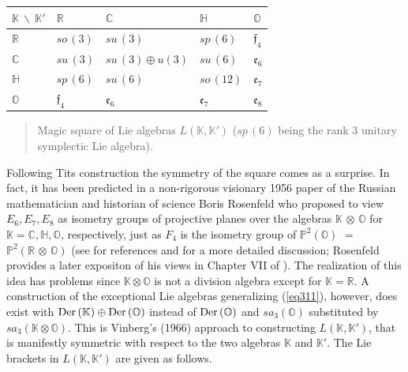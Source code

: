 \documentclass{article}
\begin{document}
\bigskip

\begin{tabular}{|C{1cm}|C{2cm}|C{2cm}|C{2cm}|C{2cm}|}
\hline ${\mathbb K} \ \backslash \ {\mathbb K}'$ &${\mathbb R}$ &${\mathbb C}$ &${\mathbb H}$ &${\mathbb O}$  \\
\hline ${\mathbb R}$ &$so \, (3)$ &$su \, (3)$ &$sp \, (6)$ &${\mathfrak f}_4$  \\
\hline ${\mathbb C}$ &$su \, (3)$ &$su \, (3) \oplus u(3)$ &$su \, (6)$ &${\mathfrak e}_6$ \\
\hline ${\mathbb H}$ &$sp \, (6)$ &$su \, (6)$ &$so \, (12)$ &${\mathfrak e}_7$ \\
\hline ${\mathbb O}$ &${\mathfrak f}_4$ &${\mathfrak e}_6$ &${\mathfrak e}_7$ &${\mathfrak e}_8$ \\
\hline
\end{tabular}

\smallskip

\begin{quotation}
 Magic square of Lie algebras $L({\mathbb K} , {\mathbb K}')$ ($sp \, (6)$ being the rank 3 unitary symplectic Lie algebra).
\end{quotation}

\smallskip

Following Tits construction the symmetry of the square comes as a surprise. In fact, it has been predicted in a non-rigorous visionary 1956 paper of the Russian mathematician and historian of science Boris Rosenfeld who proposed to view $E_6 , E_7 , E_8$ as isometry groups of projective planes over the algebras ${\mathbb K} \, \otimes \, {\mathbb O}$ for ${\mathbb K} = {\mathbb C} , {\mathbb H}, {\mathbb O}$, respectively, just as $F_4$ is the isometry group of ${\mathbb P}^2 ({\mathbb O})$ $=$ ${\mathbb P}^2 ({\mathbb R} \, \otimes \, {\mathbb O})$ (see \cite{B} for references and for a more detailed 
discussion; Rosenfeld provides a later expositon of his views in Chapter VII of \cite{R}). The realization of this idea has problems since ${\mathbb K} \otimes {\mathbb O}$ is not a division algebra except for ${\mathbb K} = {\mathbb R}$. A construction of the exceptional Lie algebras generalizing (\ref{eq311}), however, does exist with ${\rm Der} \, ({\mathbb K}) \oplus {\rm Der} \, ({\mathbb O})$ instead of ${\rm Der} \, ({\mathbb O})$ and $sa_3 ({\mathbb O})$ substituted by $sa_3 ({\mathbb K} \otimes {\mathbb O})$. This is Vinberg's (1966) approach to constructing $L({\mathbb K} , {\mathbb K}')$, that is manifestly symmetric with respect to the two algebras ${\mathbb K}$ and ${\mathbb K}'$. The Lie brackets in $L({\mathbb K} , {\mathbb K}')$ are given as follows.
\end{document}
